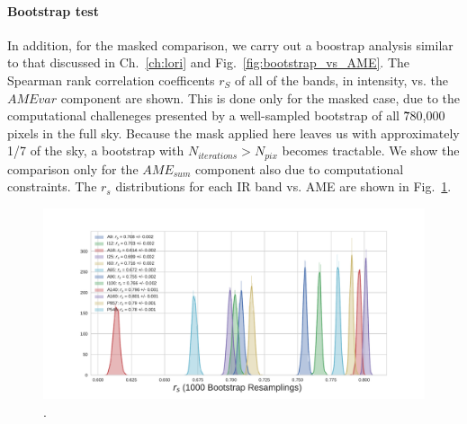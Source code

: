           \paragraph{Bootstrap test}
              In addition, for the masked comparison, we carry out a boostrap analysis similar to that discussed in Ch.~\ref{ch:lori} and Fig.~\ref{fig:bootstrap_vs_AME}. The Spearman rank correlation coefficents $r_{S}$ of all of the bands, in intensity, vs. the $AME{var}$ component are shown. This is done only for the masked case, due to the computational challeneges presented by a well-sampled bootstrap of all \~780,000 pixels in the full sky. Because the mask applied here leaves us with approximately 1/7 of the sky, a bootstrap with $N_{iterations} > N_{pix}$ becomes tractable. We show the comparison only for the $AME_{sum}$ component also due to computational constraints. The $r_{s}$ distributions for each IR band vs. AME are shown in Fig.~\ref{fig:bootstrap_vs_AME_allsky_masked}.
                \begin{figure}
                     \includegraphics[width=\textwidth]{../Plots/ch_allsky/bootstrap_vs_AME_spearman_maskall_i1000.pdf}
                     \centering
                     \caption{.}
                     \label{fig:bootstrap_vs_AME_allsky_masked}
                \end{figure}

